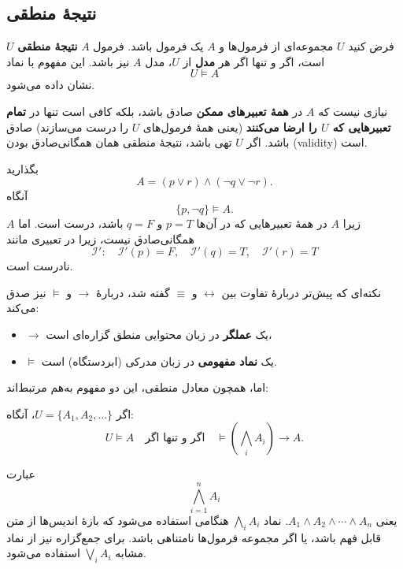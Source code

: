 \subsection*{ نتیجه‌ٔ منطقی }
    \begin{definition}[تعریف \lr{2.48}]
      فرض کنید $U$ مجموعه‌ای از فرمول‌ها و $A$ یک فرمول باشد. فرمول $A$ \textbf{نتیجه‌ٔ منطقی} $U$ است، اگر و تنها اگر هر \textbf{مدل} از $U$، مدل $A$ نیز باشد. این مفهوم با نماد
      \[
      U \models A
      \]
      نشان داده می‌شود.
      
      نیازی نیست که $A$ در \textbf{همهٔ تعبیرهای ممکن} صادق باشد، بلکه کافی است تنها در \textbf{تمام تعبیرهایی که $U$ را ارضا می‌کنند} (یعنی همهٔ فرمول‌های $U$ را درست می‌سازند) صادق باشد. اگر $U$ تهی باشد، نتیجه‌ٔ منطقی همان همگانی‌صادق بودن (validity) است.
    \end{definition}
    
    \begin{example}[مثال \lr{2.49}]
      بگذارید
      \[
      A = (p \lor r) \land (\neg q \lor \neg r).
      \]
      آنگاه
      \[
      \{p, \neg q\} \models A.
      \]
      زیرا $A$ در همهٔ تعبیرهایی که در آن‌ها $p =T$ و $q = F$ باشد، درست است. اما $A$ همگانی‌صادق نیست، زیرا در تعبیری مانند
      \[
      \mathscr{I}':\quad \mathscr{I}'(p) = F,\quad \mathscr{I}'(q) = T,\quad \mathscr{I}'(r) = T
      \]
      نادرست است.
    \end{example}
    
    نکته‌ای که پیش‌تر دربارهٔ تفاوت بین $\leftrightarrow$ و $\equiv$ گفته شد، دربارهٔ $\to$ و $\models$ نیز صدق می‌کند:
    
    \begin{itemize}
      \item $\to$ یک \textbf{عملگر} در زبان محتوایی منطق گزاره‌ای است،
      \item $\models$ یک \textbf{نماد مفهومی} در زبان مدرکی (ابردستگاه) است.
    \end{itemize}
    
    اما، همچون معادل منطقی، این دو مفهوم به‌هم مرتبط‌اند:
    
    \begin{theorem}[قضیه \lr{2.50}]
      اگر $U = \{A_1, A_2, \dots\}$، آنگاه:
      \[
      U \models A \quad \text{اگر و تنها اگر} \quad \models \left(\bigwedge_i A_i\right) \to A.
      \]
    \end{theorem}
    
    \begin{definition}[تعریف \lr{2.51}]
      عبارت
      \[
      \bigwedge_{i=1}^n A_i
      \]
      یعنی $A_1 \land A_2 \land \cdots \land A_n$. نماد $\bigwedge_i A_i$ هنگامی استفاده می‌شود که بازهٔ اندیس‌ها از متن قابل فهم باشد، یا اگر مجموعه فرمول‌ها نامتناهی باشد. برای جمع‌گزاره نیز از نماد مشابه $\bigvee_i A_i$ استفاده می‌شود.
    \end{definition}
    

